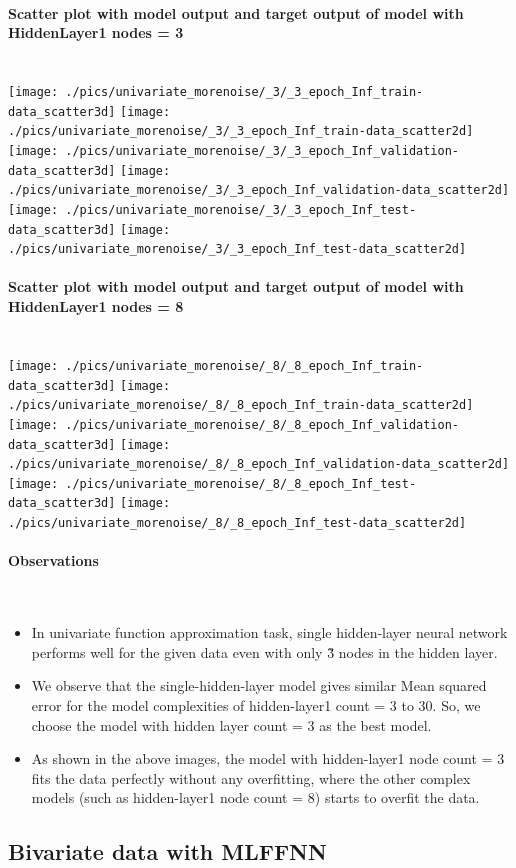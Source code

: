 \documentclass[fleqn]{article}
\newcommand{\myparagraph}[1]{\paragraph{#1}\mbox{}\\}
\begin{document}
\newpage
\myparagraph{Scatter plot with model output and target output of model with HiddenLayer1 nodes = 3}

\texttt{[image: ./pics/univariate\_morenoise/\_3/\_3\_epoch\_Inf\_train-data\_scatter3d]}
\texttt{[image: ./pics/univariate\_morenoise/\_3/\_3\_epoch\_Inf\_train-data\_scatter2d]}
\texttt{[image: ./pics/univariate\_morenoise/\_3/\_3\_epoch\_Inf\_validation-data\_scatter3d]}
\texttt{[image: ./pics/univariate\_morenoise/\_3/\_3\_epoch\_Inf\_validation-data\_scatter2d]}
\texttt{[image: ./pics/univariate\_morenoise/\_3/\_3\_epoch\_Inf\_test-data\_scatter3d]}
\texttt{[image: ./pics/univariate\_morenoise/\_3/\_3\_epoch\_Inf\_test-data\_scatter2d]}

\newpage
\myparagraph{Scatter plot with model output and target output of model with HiddenLayer1 nodes = 8}

\texttt{[image: ./pics/univariate\_morenoise/\_8/\_8\_epoch\_Inf\_train-data\_scatter3d]}
\texttt{[image: ./pics/univariate\_morenoise/\_8/\_8\_epoch\_Inf\_train-data\_scatter2d]}
\texttt{[image: ./pics/univariate\_morenoise/\_8/\_8\_epoch\_Inf\_validation-data\_scatter3d]}
\texttt{[image: ./pics/univariate\_morenoise/\_8/\_8\_epoch\_Inf\_validation-data\_scatter2d]}
\texttt{[image: ./pics/univariate\_morenoise/\_8/\_8\_epoch\_Inf\_test-data\_scatter3d]}
\texttt{[image: ./pics/univariate\_morenoise/\_8/\_8\_epoch\_Inf\_test-data\_scatter2d]}

\myparagraph{Observations}

\begin{itemize}
  \item In univariate function approximation task, single hidden-layer neural network performs well for the given data even with only \~ 3 nodes in the hidden layer.
  \item We observe that the single-hidden-layer model gives similar Mean squared error for the model complexities of hidden-layer1 count = 3 to 30. So, we choose the model with hidden layer count = 3 as the best model.
  \item As shown in the above images, the model with hidden-layer1 node count = 3 fits the data perfectly without any overfitting, where the other complex models (such as hidden-layer1 node count = 8) starts to overfit the data. 
\end{itemize}


\newpage
\subsection{Bivariate data with MLFFNN}
\end{document}
